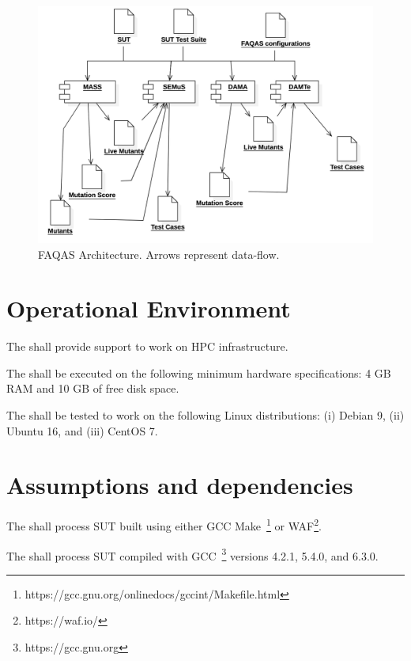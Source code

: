 \begin{figure}[h]
	\centering
		\includegraphics[width=12cm]{images/Architecture}
		\caption{FAQAS Architecture. Arrows represent data-flow.}
		\label{fig:architecture}
	\end{figure}

\clearpage
\section{Operational Environment}

\RQ{} 

\RQ{} The \FAQAS shall provide support to work on HPC infrastructure.

\RQ{} The \FAQAS shall be executed on the following minimum hardware specifications: 4 GB RAM and 10 GB of free disk space.


\RQ{} The \FAQAS shall be tested to work on the following Linux distributions: (i) Debian 9, (ii) Ubuntu 16, and (iii) CentOS 7.



\section{Assumptions and dependencies}

\RQ{} The \FAQAS shall process SUT built using either GCC Make~\footnote{https://gcc.gnu.org/onlinedocs/gccint/Makefile.html} or WAF\footnote{https://waf.io/}.

\RQ{} The \FAQAS shall process SUT compiled with GCC~\footnote{https://gcc.gnu.org} versions 4.2.1, 5.4.0, and 6.3.0.

